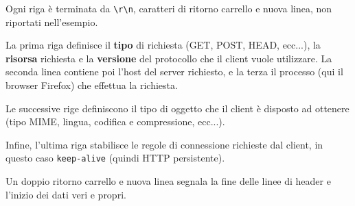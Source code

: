 \documentclass[a4paper,11pt]{article}
\begin{document}
Ogni riga è terminata da \lstinline|\r\n|, caratteri di ritorno carrello e nuova linea, non riportati nell'esempio.

La prima riga definisce il \textbf{tipo} di richiesta (GET, POST, HEAD, ecc...), la \textbf{risorsa} richiesta e la \textbf{versione} del protocollo che il client vuole utilizzare. 
La seconda linea contiene poi l'host del server richiesto, e la terza il processo (qui il browser Firefox) che effettua la richiesta.

Le successive rige definiscono il tipo di oggetto che il client è disposto ad ottenere (tipo MIME, lingua, codifica e compressione, ecc...).

Infine, l'ultima riga stabilisce le regole di connessione richieste dal client, in questo caso \lstinline|keep-alive| (quindi HTTP persistente).

Un doppio ritorno carrello e nuova linea segnala la fine delle linee di header e l'inizio dei dati veri e propri.
\end{document}
